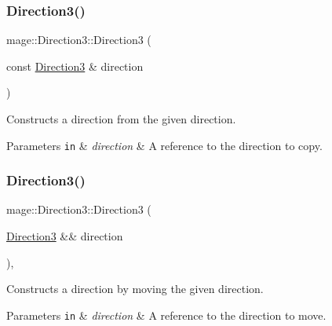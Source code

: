 \subsubsection{\texorpdfstring{Direction3()}{Direction3()}\hspace{0.1cm}{\footnotesize\ttfamily [3/8]}}
{\footnotesize\ttfamily mage\+::\+Direction3\+::\+Direction3 (\begin{DoxyParamCaption}\item[{const \hyperlink{structmage_1_1_direction3}{Direction3} \&}]{direction }\end{DoxyParamCaption})\hspace{0.3cm}{\ttfamily [default]}}

Constructs a direction from the given direction.


\begin{DoxyParams}[1]{Parameters}
\mbox{\tt in}  & {\em direction} & A reference to the direction to copy. \\
\hline
\end{DoxyParams}
\hypertarget{structmage_1_1_direction3_a3852489e86ad55937e50aa17b15ccd05}{}\label{structmage_1_1_direction3_a3852489e86ad55937e50aa17b15ccd05} 
\subsubsection{\texorpdfstring{Direction3()}{Direction3()}\hspace{0.1cm}{\footnotesize\ttfamily [4/8]}}
{\footnotesize\ttfamily mage\+::\+Direction3\+::\+Direction3 (\begin{DoxyParamCaption}\item[{\hyperlink{structmage_1_1_direction3}{Direction3} \&\&}]{direction }\end{DoxyParamCaption})\hspace{0.3cm}{\ttfamily [default]}, {\ttfamily [noexcept]}}

Constructs a direction by moving the given direction.


\begin{DoxyParams}[1]{Parameters}
\mbox{\tt in}  & {\em direction} & A reference to the direction to move. \\
\hline
\end{DoxyParams}
\hypertarget{structmage_1_1_direction3_a3f4daf4fbf2e873bcf9133eca22fad34}{}\label{structmage_1_1_direction3_a3f4daf4fbf2e873bcf9133eca22fad34} 
